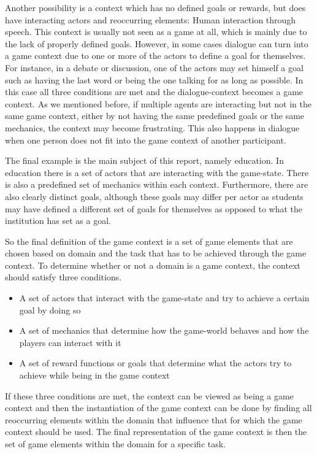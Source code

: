 \documentclass[11pt]{article}
\begin{document}
Another possibility is a context which has no defined goals or rewards, but does have interacting actors and reoccurring elements: Human interaction through speech. This context is usually not seen as a game at all, which is mainly due to the lack of properly defined goals. However, in some cases dialogue can turn into a game context due to one or more of the actors to define a goal for themselves. For instance, in a debate or discussion, one of the actors may set himself a goal such as having the last word or being the one talking for as long as possible. In this case all three conditions are met and the dialogue-context becomes a game context. As we mentioned before, if multiple agents are interacting but not in the same game context, either by not having the same predefined goals or the same mechanics, the context may become frustrating. This also happens in dialogue when one person does not fit into the game context of another participant.

The final example is the main subject of this report, namely education. In education there is a set of actors that are interacting with the game-state. There is also a predefined set of mechanics within each context. Furthermore, there are also clearly distinct goals, although these goals may differ per actor as students may have defined a different set of goals for themselves as opposed to what the institution has set as a goal.

So the final definition of the game context is a set of game elements that are chosen based on domain and the task that has to be achieved through the game context. To determine whether or not a domain is a game context, the context should satisfy three conditions.

\begin{itemize}
  \item A set of actors that interact with the game-state and try to achieve a certain goal by doing so
  \item A set of mechanics that determine how the game-world behaves and how the players can interact with it
  \item A set of reward functions or goals that determine what the actors try to achieve while being in the game context
\end{itemize}

If these three conditions are met, the context can be viewed as being a game context and then the instantiation of the game context can be done by finding all reoccurring elements within the domain that influence that for which the game context should be used. The final representation of the game context is then the set of game elements within the domain for a specific task.
\end{document}

